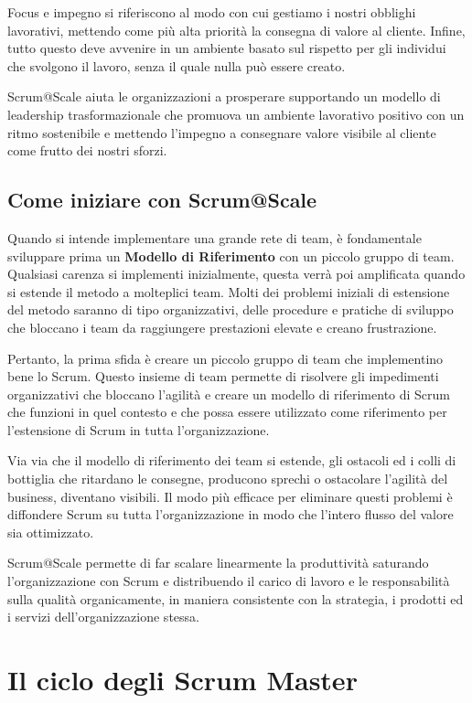 \documentclass[12pt,a4paper,parskip=full]{scrartcl}
\begin{document}
Focus e impegno si riferiscono al modo con cui gestiamo i nostri obblighi lavorativi, mettendo come più alta priorità la consegna di valore al cliente. Infine, tutto questo deve avvenire in un ambiente basato sul rispetto per gli individui che svolgono il lavoro, senza il quale nulla può essere creato.

Scrum@Scale aiuta le organizzazioni a prosperare supportando un modello di leadership trasformazionale che promuova un ambiente lavorativo positivo con un ritmo sostenibile e mettendo l'impegno a consegnare valore visibile al cliente come frutto dei nostri sforzi.

\subsection{Come iniziare con Scrum@Scale}
Quando si intende implementare una grande rete di team, è fondamentale sviluppare prima un \textbf{Modello di Riferimento} con un piccolo gruppo di team. Qualsiasi carenza si implementi inizialmente, questa verrà poi amplificata quando si estende il metodo a molteplici team. Molti dei problemi iniziali di estensione del metodo saranno di tipo organizzativi, delle procedure e pratiche di sviluppo che bloccano i team da raggiungere prestazioni elevate e creano frustrazione.

Pertanto, la prima sfida è creare un piccolo gruppo di team che implementino bene lo Scrum. Questo insieme di team permette di risolvere gli impedimenti organizzativi che bloccano l'agilità e creare un modello di riferimento di Scrum che funzioni in quel contesto e che possa essere utilizzato come riferimento per l'estensione di Scrum in tutta l'organizzazione.

Via via che il modello di riferimento dei team si estende, gli ostacoli ed i colli di bottiglia che ritardano le consegne, producono sprechi o ostacolare l'agilità del business,  diventano visibili. Il modo più efficace per eliminare questi problemi è diffondere Scrum su tutta l'organizzazione in modo che l'intero flusso del valore sia ottimizzato.

Scrum@Scale permette di far scalare linearmente la produttività saturando l'organizzazione con Scrum e distribuendo il carico di lavoro e le responsabilità sulla  qualità organicamente, in maniera consistente con la strategia, i prodotti ed i servizi dell'organizzazione stessa.

\section{Il ciclo degli Scrum Master}
\end{document}
